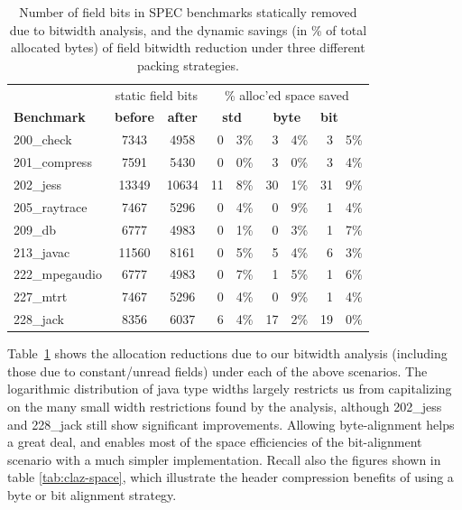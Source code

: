 \documentclass[preprint]{acmconf}
\begin{document}
\begin{table}
\begin{tabular}{lccr@{.}lr@{.}lr@{.}l}
&\multicolumn{2}{c}{static field bits}&
 \multicolumn{6}{c}{\% alloc'ed space saved} \\
\bf Benchmark &
\bf before & \bf after &
\multicolumn{2}{c}{\bf std} &
\multicolumn{2}{c}{\bf byte} &
\multicolumn{2}{l}{\bf bit} \\ \hline
200\_check	& 7343& 4958&  0&3\% &  3&4\% &  3&5\% \\
201\_compress	& 7591& 5430&  0&0\% &  3&0\% &  3&4\% \\
202\_jess	&13349&10634& 11&8\% & 30&1\% & 31&9\% \\
205\_raytrace	& 7467& 5296&  0&4\% &  0&9\% &  1&4\% \\
209\_db 	& 6777& 4983&  0&1\% &  0&3\% &  1&7\% \\
213\_javac	&11560& 8161&  0&5\% &  5&4\% &  6&3\% \\
222\_mpegaudio	& 6777& 4983&  0&7\% &  1&5\% &  1&6\% \\
227\_mtrt	& 7467& 5296&  0&4\% &  0&9\% &  1&4\% \\
228\_jack	& 8356& 6037&  6&4\% & 17&2\% & 19&0\% \\
\end{tabular}
\caption{Number of field bits in SPEC benchmarks statically removed
  due to bitwidth analysis,
  and the dynamic savings (in \% of total allocated bytes) of
  field bitwidth reduction under three different packing strategies.}
\label{tab:bitwidth-results}
\end{table}

Table~\ref{tab:bitwidth-results} shows the allocation reductions due
to our bitwidth
analysis (including those due to constant/unread fields)
under each of the above scenarios.  The logarithmic distribution of
java type widths largely restricts us from capitalizing on the many small
width restrictions found by the analysis, although 202\_jess and
228\_jack still show significant improvements.  Allowing
byte-alignment helps a great deal, and enables most of the space
efficiencies of the bit-alignment scenario with a much simpler
implementation.  Recall also the figures shown in
table \ref{tab:claz-space}, which illustrate the header compression
benefits of using a byte or bit alignment strategy.
\end{document}
